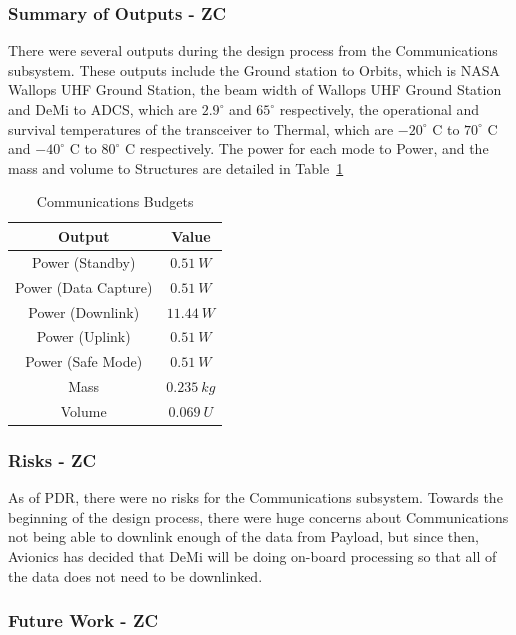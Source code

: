 \documentclass[12pt]{article}
\begin{document}
			\subsubsection{Summary of Outputs - ZC}

There were several outputs during the design process from the Communications subsystem. These outputs include the Ground station to Orbits, which is NASA Wallops UHF Ground Station, the beam width of Wallops UHF Ground Station and DeMi to ADCS, which are $2.9^\circ$ and $65^\circ$ respectively, the operational and survival temperatures of the transceiver to Thermal, which are $-20^\circ$ C to $70^\circ$ C and $-40^\circ$ C to $80^\circ$ C respectively. The power for each mode to Power, and the mass and volume to Structures are detailed in Table~\ref{table:comm_summary_outputs}

\begin{table}[ht]
\caption{Communications Budgets}
\label{table:comm_summary_outputs}
\begin{center}
    \begin{tabular}{|c||c|} \hline
    	Output & Value \\ \hline \hline
    Power (Standby) & $0.51\ W$  \\
    Power (Data Capture) & $0.51\ W$ \\
    Power (Downlink) & $11.44\ W$ \\
    Power (Uplink) & $0.51\ W$ \\
    Power (Safe Mode) & $0.51\ W$ \\
    Mass & $0.235\ kg$  \\
    Volume & $0.069\ U$ \\ \hline 
    \end{tabular}
\end{center}
\end{table}

			\subsubsection{Risks - ZC}

As of PDR, there were no risks for the Communications subsystem. Towards the beginning of the design process, there were huge concerns about Communications not being able to downlink enough of the data from Payload, but since then, Avionics has decided that DeMi will be doing on-board processing so that all of the data does not need to be downlinked.

			\subsubsection{Future Work - ZC}
\end{document}
